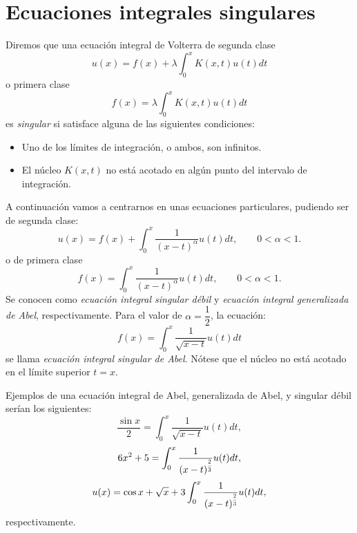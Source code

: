 \section{Ecuaciones integrales singulares}
\begin{definicion}
	Diremos que una ecuación integral de Volterra de segunda clase
	\begin{equation}
		u(x) = f(x) + \lambda \int_0^x K(x,t)u(t)dt
	\end{equation}
	o primera clase 
	\begin{equation}
		f(x) = \lambda \int_0^x K(x,t)u(t)dt
	\end{equation}
	es \textit{singular} si satisface alguna de las siguientes condiciones:
	\begin{itemize}
		\item Uno de los límites de integración, o ambos, son infinitos.
		\item El núcleo $K(x,t)$ no está acotado en algún punto del intervalo de integración.
	\end{itemize}
\end{definicion}
A continuación vamos a centrarnos en unas ecuaciones particulares, pudiendo ser de segunda clase:
\begin{equation}\label{}
	u(x) = f(x) + \int_0^x \dfrac{1}{(x-t)^\alpha}u(t)dt, \qquad 0 < \alpha < 1.
\end{equation}
o de primera clase
\begin{equation}\label{}
	f(x) = \int_0^x \dfrac{1}{(x-t)^\alpha}u(t)dt, \qquad 0 < \alpha < 1.
\end{equation}
Se conocen como \textit{ecuación integral singular débil} y \textit{ecuación integral generalizada de Abel}, respectivamente. Para el valor de $\alpha = \dfrac{1}{2}$, la ecuación:
\begin{equation}\label{}
	f(x) = \int_0^x \dfrac{1}{\sqrt{x-t}}u(t)dt
\end{equation}
se llama \textit{ecuación integral singular de Abel}. Nótese que el núcleo no está acotado en el límite superior $t = x$. 
\begin{ejemplo}
	Ejemplos de una ecuación integral de Abel, generalizada de Abel, y singular débil serían los siguientes:
	\begin{equation}\label{}
		\dfrac{\sin x}{2} = \int_0^x \dfrac{1}{\sqrt{x-t}}u(t)dt,
	\end{equation}
		\begin{equation}\label{}
		6x^2 + 5 = \int_0^x \dfrac{1}{(x-t)^{\scaleto{\dfrac{2}{3}}{12pt}}}u(t)dt,
	\end{equation}
		\begin{equation}\label{}
		u(x) = \cos x + \sqrt{x} + 3\int_0^x \dfrac{1}{(x-t)^{\scaleto{\dfrac{2}{3}}{12pt}}}u(t)dt,
	\end{equation}
	respectivamente.
\end{ejemplo}

\endinput